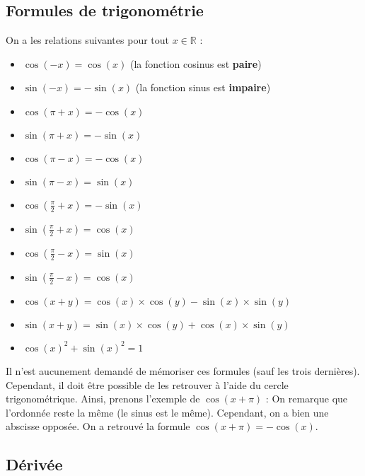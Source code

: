 	\subsection{Formules de trigonométrie}

	\begin{formula}[Formules]
		On a les relations suivantes pour tout $x \in \mathbb{R}$ :
		\begin{itemize}
			\item $\cos(-x) = \cos(x)$ (la fonction cosinus est \textbf{paire})
			\item $\sin(-x) = -\sin(x)$ (la fonction sinus est \textbf{impaire})
			\item $\cos(\pi + x) = -\cos(x)$
			\item $\sin(\pi + x) = -\sin(x)$
			\item $\cos(\pi - x) = -\cos(x)$
			\item $\sin(\pi - x) = \sin(x)$
			\item $\cos \left(\frac{\pi}{2} + x \right) = -\sin(x)$
			\item $\sin \left(\frac{\pi}{2} + x \right) = \cos(x)$
			\item $\cos \left(\frac{\pi}{2} - x \right) = \sin(x)$
			\item $\sin \left(\frac{\pi}{2} - x \right) = \cos(x)$
			\item $\cos(x + y) = \cos(x) \times \cos(y) - \sin(x) \times \sin(y)$
			\item $\sin(x + y) = \sin(x) \times \cos(y) + \cos(x) \times \sin(y)$
			\item $\cos(x)^2 + \sin(x)^2 = 1$
		\end{itemize}
	\end{formula}

	\begin{tip}
		Il n'est aucunement demandé de mémoriser ces formules (sauf les trois dernières). Cependant, il doit être possible de les retrouver à l'aide du cercle trigonométrique. Ainsi, prenons l'exemple de $\cos(x + \pi)$ :
		On remarque que l'ordonnée reste la même (le sinus est le même). Cependant, on a bien une abscisse opposée. On a retrouvé la formule $\cos(x + \pi) = -\cos(x)$.
	\end{tip}

	\subsection{Dérivée}

